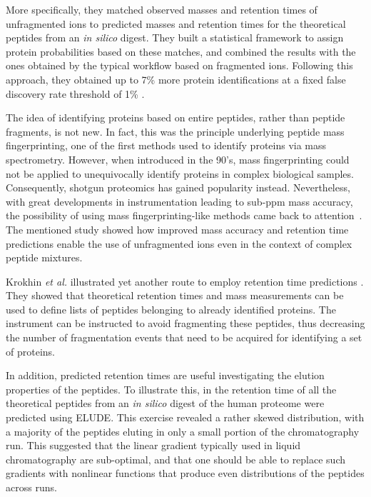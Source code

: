 \documentclass[a4paper]{article}
\begin{document}
More specifically, they matched observed masses and retention times of
unfragmented ions to predicted masses and retention times for the
theoretical peptides from an {\it in silico} digest. They built a
statistical framework to assign protein probabilities based on these
matches, and combined the results with the ones obtained by the
typical workflow based on fragmented ions. Following this approach, they
obtained up to 7\% more protein identifications at a fixed false
discovery rate threshold of 1\% \cite{mf}.

The idea of identifying proteins based on entire peptides, rather than
peptide fragments, is not new. In fact, this was the principle
underlying peptide mass fingerprinting, one of the first methods used
to identify proteins via mass spectrometry. However, when introduced
in the 90's, mass fingerprinting could not be applied to unequivocally
identify proteins in complex biological samples. Consequently, shotgun
proteomics has gained popularity instead. Nevertheless, with great
developments in instrumentation leading to sub-ppm mass accuracy, the
possibility of using mass fingerprinting-like methods came back to
attention~\cite{iamt1}. The mentioned study showed how improved mass
accuracy and retention time predictions enable the use of unfragmented
ions even in the context of complex peptide mixtures.

Krokhin {\em et al.} illustrated yet another route to employ retention time
predictions \cite{krokhin200612, McQueen2012}. They showed that
theoretical retention times and mass measurements can be used to
define lists of peptides belonging to already identified proteins. The
instrument can be instructed to avoid fragmenting these peptides, thus
decreasing the number of fragmentation events that need to be acquired
for identifying a set of proteins.

In addition, predicted retention times are useful investigating the
elution properties of the peptides.  To illustrate this, in
\cite{elude1} the retention time of all the theoretical peptides from
an {\it in silico} digest of the human proteome were predicted using
{\sc ELUDE}. This exercise revealed a rather skewed distribution, with
a majority of the peptides eluting in only a small portion of the
chromatography run. This suggested that the linear gradient typically
used in liquid chromatography are sub-optimal, and that one should be
able to replace such gradients with nonlinear functions that produce
even distributions of the peptides across runs.
\end{document}
